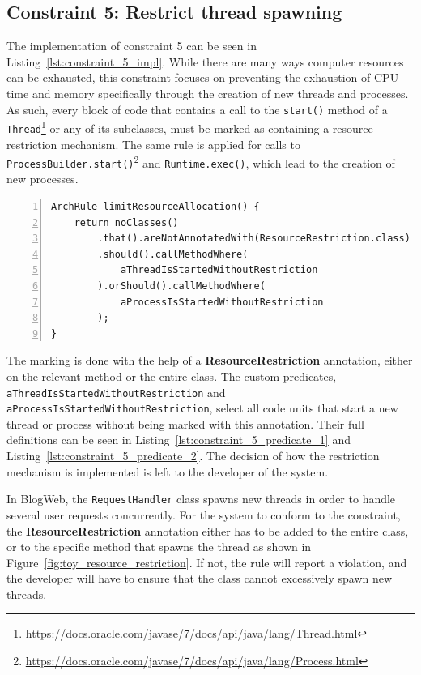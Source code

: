 \subsection{Constraint 5: Restrict thread spawning}
The implementation of constraint 5 can be seen in Listing~\ref{lst:constraint_5_impl}.
While there are many ways computer resources can be exhausted, this constraint focuses on preventing the exhaustion of CPU time and memory specifically through the creation of new threads and processes. As such, every block of code that contains a call to the \texttt{start()} method of a \texttt{Thread}\footnote{\url{https://docs.oracle.com/javase/7/docs/api/java/lang/Thread.html}} or any of its subclasses, must be marked as containing a resource restriction mechanism. The same rule is applied for calls to \texttt{ProcessBuilder.start()}\footnote{\url{https://docs.oracle.com/javase/7/docs/api/java/lang/Process.html}\label{fnt:java_process}} and \texttt{Runtime.exec()}, which lead to the creation of new processes.

\begin{minipage}{\linewidth}
\begin{lstlisting}[caption={Rule definition for constraint 5.}, captionpos=b, label=lst:constraint_5_impl, numbers=left]
ArchRule limitResourceAllocation() {
    return noClasses()
        .that().areNotAnnotatedWith(ResourceRestriction.class)
        .should().callMethodWhere(
            aThreadIsStartedWithoutRestriction
        ).orShould().callMethodWhere(
            aProcessIsStartedWithoutRestriction
        );
}
\end{lstlisting}
\end{minipage}

The marking is done with the help of a \textbf{ResourceRestriction} annotation, either on the relevant method or the entire class. The custom predicates, \texttt{aThreadIsStarted\-WithoutRestriction} and \texttt{aProcessIsStartedWithoutRestriction}, select all code units that start a new thread or process without being marked with this annotation. Their full definitions can be seen in Listing~\ref{lst:constraint_5_predicate_1} and Listing~\ref{lst:constraint_5_predicate_2}. The decision of how the restriction mechanism is implemented is left to the developer of the system.

In BlogWeb, the \texttt{RequestHandler} class spawns new threads in order to handle several user requests concurrently. For the system to conform to the constraint, the \textbf{ResourceRestriction} annotation either has to be added to the entire class, or to the specific method that spawns the thread as shown in Figure~\ref{fig:toy_resource_restriction}. If not, the rule will report a violation, and the developer will have to ensure that the class cannot excessively spawn new threads.

